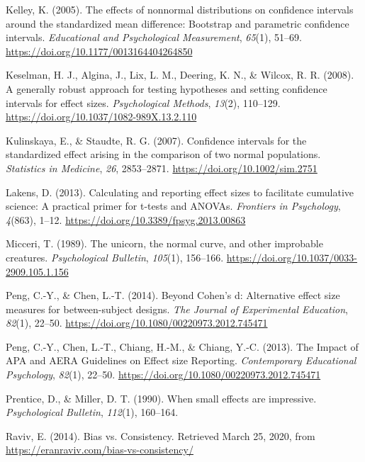 \documentclass[
  english,
  man,floatsintext]{apa6}
\begin{document}
\leavevmode\hypertarget{ref-Kelley_2005}{}%
Kelley, K. (2005). The effects of nonnormal distributions on confidence intervals around the standardized mean difference: Bootstrap and parametric confidence intervals. \emph{Educational and Psychological Measurement}, \emph{65}(1), 51--69. \url{https://doi.org/10.1177/0013164404264850}

\leavevmode\hypertarget{ref-Keselman_et_al_2008}{}%
Keselman, H. J., Algina, J., Lix, L. M., Deering, K. N., \& Wilcox, R. R. (2008). A generally robust approach for testing hypotheses and setting confidence intervals for effect sizes. \emph{Psychological Methods}, \emph{13}(2), 110--129. \url{https://doi.org/10.1037/1082-989X.13.2.110}

\leavevmode\hypertarget{ref-Kulinskaya_Staudte_2007}{}%
Kulinskaya, E., \& Staudte, R. G. (2007). Confidence intervals for the standardized effect arising in the comparison of two normal populations. \emph{Statistics in Medicine}, \emph{26}, 2853--2871. \url{https://doi.org/10.1002/sim.2751}

\leavevmode\hypertarget{ref-Lakens_2013}{}%
Lakens, D. (2013). Calculating and reporting effect sizes to facilitate cumulative science: A practical primer for t-tests and ANOVAs. \emph{Frontiers in Psychology}, \emph{4}(863), 1--12. \url{https://doi.org/10.3389/fpsyg.2013.00863}

\leavevmode\hypertarget{ref-Micceri_1989}{}%
Micceri, T. (1989). The unicorn, the normal curve, and other improbable creatures. \emph{Psychological Bulletin}, \emph{105}(1), 156--166. \url{https://doi.org/10.1037/0033-2909.105.1.156}

\leavevmode\hypertarget{ref-Peng_and_Chen_2014}{}%
Peng, C.-Y., \& Chen, L.-T. (2014). Beyond Cohen's d: Alternative effect size measures for between-subject designs. \emph{The Journal of Experimental Education}, \emph{82}(1), 22--50. \url{https://doi.org/10.1080/00220973.2012.745471}

\leavevmode\hypertarget{ref-Peng_et_al_2013}{}%
Peng, C.-Y., Chen, L.-T., Chiang, H.-M., \& Chiang, Y.-C. (2013). The Impact of APA and AERA Guidelines on Effect size Reporting. \emph{Contemporary Educational Psychology}, \emph{82}(1), 22--50. \url{https://doi.org/10.1080/00220973.2012.745471}

\leavevmode\hypertarget{ref-Prentice_Miller_1992}{}%
Prentice, D., \& Miller, D. T. (1990). When small effects are impressive. \emph{Psychological Bulletin}, \emph{112}(1), 160--164.

\leavevmode\hypertarget{ref-Raviv}{}%
Raviv, E. (2014). Bias vs. Consistency. Retrieved March 25, 2020, from \url{https://eranraviv.com/bias-vs-consistency/}
\end{document}
